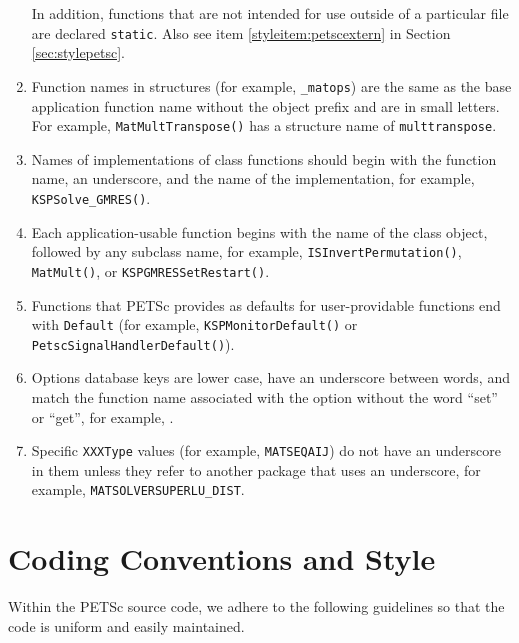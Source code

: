 \begin{enumerate}
      In addition, functions that are not intended for use outside
      of a particular file are declared \lstinline{static}.
      Also see item \ref{styleitem:petscextern} in Section \ref{sec:stylepetsc}.
\item Function names in structures (for example, \lstinline{_matops}) are the same as the base application
      function name without the object prefix and are in small letters.
      For example, \lstinline{MatMultTranspose()} has a structure name of
      \lstinline{multtranspose}.
\item Names of implementations of class functions should begin with the function name, an underscore, and the name of the implementation, for example, \lstinline{KSPSolve_GMRES()}.
\item Each application-usable function begins with the name of the class object, followed by any subclass name,
  for example, \lstinline{ISInvertPermutation()}, \lstinline{MatMult()}, or \lstinline{KSPGMRESSetRestart()}.
\item Functions that PETSc provides as defaults for user-providable functions end with \lstinline{Default} (for example, \lstinline{KSPMonitorDefault()} or \lstinline{PetscSignalHandlerDefault()}).
\item Options database keys are lower case, have an underscore between words, and match the function name associated with the option without the word ``set'' or ``get'',
for example, .
\item Specific \lstinline{XXXType} values (for example, \lstinline{MATSEQAIJ}) do not have an underscore in them unless they refer to another package that uses an underscore, for example, \lstinline{MATSOLVERSUPERLU_DIST}.
\end{enumerate}

\section{Coding Conventions and Style}
Within the PETSc source code, we adhere to the following guidelines
so that the code is uniform and easily maintained.

